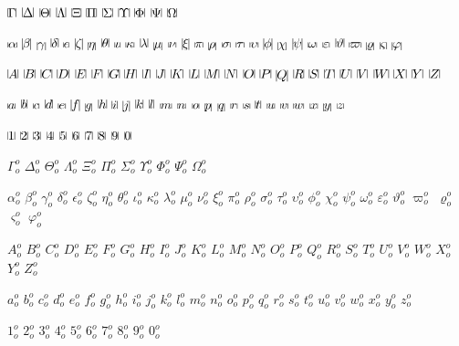 \documentclass[12pt]{article}
\begin{document}
\def\doGreek{%
 \do\Gamma\do\Delta\do\Theta\do\Lambda\do\Xi\do\Pi\do\Sigma\do\Upsilon\do\Phi
 \do\Psi\do\Omega
}

\def\dogreek{%
 \do\alpha\do\beta\do\gamma\do\delta\do\epsilon\do\zeta\do\eta\do\theta\do\iota
 \do\kappa\do\lambda\do\mu\do\nu\do\xi\do\pi\do\rho\do\sigma\do\tau\do\upsilon
 \do\phi\do\chi\do\psi\do\omega\do\varepsilon\do\vartheta\do\varpi\do\varrho
 \do\varsigma\do\varphi
}

\def\doRoman{%
 \do A\do B\do C\do D\do E\do F\do G\do H\do I\do J\do K\do L\do M\do N%
 \do O\do P\do Q\do R\do S\do T\do U\do V\do W\do X\do Y\do Z%
}

\def\doroman{%
 \do a\do b\do c\do d\do e\do f\do g\do h\do i\do j\do k\do l\do m\do n%
 \do o\do p\do q\do r\do s\do t\do u\do v\do w\do x\do y\do z%
}

\def\donumbers{\do1\do2\do3\do4\do5\do6\do7\do8\do9\do0}

\def\do#1{$\vrule#1\vrule$ }

\LARGE

\doGreek\par \dogreek\par \doRoman\par \doroman\par \donumbers\par

\def\do#1{$#1_o^o$ }

\doGreek\par \dogreek\par \doRoman\par \doroman\par \donumbers\par
\end{document}
